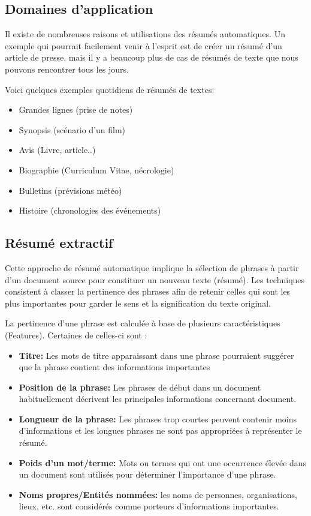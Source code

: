     \subsection{Domaines d'application}    
    Il existe de nombreuses raisons et utilisations des résumés automatiques. Un exemple qui pourrait facilement venir à l'esprit est de créer un résumé d'un article de presse, mais il y a beaucoup plus de cas de résumés de texte que nous pouvons rencontrer tous les jours.

    Voici quelques exemples quotidiens de résumés de textes:
    \begin{itemize}
        \item Grandes lignes (prise de notes)
        \item Synopsis (scénario d'un film)
        \item Avis (Livre, article..)
        \item Biographie (Curriculum Vitae, nécrologie)
        \item Bulletins (prévisions météo)
        \item Histoire (chronologies des événements)
    \end{itemize}

    \subsection{Résumé extractif}
        Cette approche de résumé automatique implique la sélection de phrases à partir d'un document source pour constituer un nouveau texte (résumé). Les techniques consistent à classer la pertinence des phrases afin de retenir celles qui sont les plus importantes pour garder le sens et la signification du texte original.

        La pertinence d'une phrase est calculée à base de plusieurs caractéristiques (Features). Certaines de celles-ci sont\cite{ratsa} :
        
        \begin{itemize}
            \item \textbf{Titre:} Les mots de titre apparaissant dans une phrase pourraient suggérer que la phrase contient des informations importantes
            \item \textbf{Position de la phrase:} Les phrases de début dans un document habituellement décrivent les principales informations concernant document.
            \item \textbf{Longueur de la phrase:} Les phrases trop courtes peuvent contenir moins d'informations et les longues phrases ne sont pas appropriées à représenter le résumé.
            \item \textbf{Poids d'un mot/terme:} Mots ou termes qui ont une occurrence élevée dans un document sont utilisés pour déterminer l'importance d'une phrase.
            \item \textbf{Noms propres/Entités nommées:} les noms de personnes, organisations, lieux, etc. sont considérés comme porteurs d'informations importantes.
        \end{itemize}   

